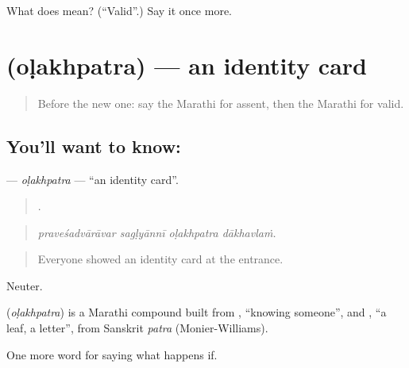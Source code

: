 \begin{tcolorbox}[breakable,colback=teal!4,colframe=teal!35!black,title={Before you move on}]
What does  mean? (\textquotedblleft{}Valid\textquotedblright{}.) Say it once more.
\end{tcolorbox}
\section[\texorpdfstring{\mr{ओळखपत्र} (oḷakhpatra)}{ओळखपत्र (oḷakhpatra)}]{ (oḷakhpatra) — an identity card}

\label{lesson:MR-C543-olakhpatra}



\begin{quote}
Before the new one: say the Marathi for assent, then the Marathi for valid.
\end{quote}

\subsection*{You'll want to know: }
\textbf{} — \emph{oḷakhpatra} — \textquotedblleft{}an identity card\textquotedblright{}.

\begin{quote}
   .
\end{quote}

\begin{quote}
\emph{praveśadvārāvar sagḷyānnī oḷakhpatra dākhavlaṁ.}
\end{quote}

\begin{quote}
Everyone showed an identity card at the entrance.
\end{quote}

Neuter.

\begin{cousinweb}
\textbf{} (\emph{oḷakhpatra}) is a Marathi compound built from , \textquotedblleft{}knowing someone\textquotedblright{}, and , \textquotedblleft{}a leaf, a letter\textquotedblright{}, from Sanskrit \emph{patra} (Monier-Williams).
\end{cousinweb}

\begin{grammarlens}[title={What you've built}]
One more word for saying what happens if.
\end{grammarlens}

